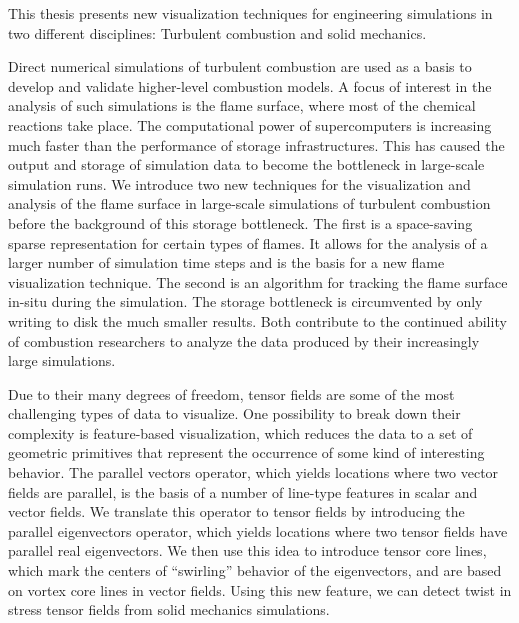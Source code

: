 %
%
This thesis presents new visualization techniques for engineering simulations in
two different disciplines: Turbulent combustion and solid mechanics.
%

%
Direct numerical simulations of turbulent combustion are used as a basis to
develop and validate higher-level combustion models.
%
A focus of interest in the analysis of such simulations is the flame surface,
where most of the chemical reactions take place.
%
The computational power of supercomputers is increasing much faster than the
performance of storage infrastructures.
%
This has caused the output and storage of simulation data to become the
bottleneck in large-scale simulation runs.
%
We introduce two new techniques for the visualization and analysis of the flame
surface in large-scale simulations of turbulent combustion before the background
of this storage bottleneck.
%
The first is a space-saving sparse representation for certain types of flames.
%
It allows for the analysis of a larger number of simulation time steps and is
the basis for a new flame visualization technique.
%
The second is an algorithm for tracking the flame surface in-situ during the
simulation.
%
The storage bottleneck is circumvented by only writing to disk the much smaller
results.
%
Both contribute to the continued ability of combustion researchers to analyze
the data produced by their increasingly large simulations.
%

%
Due to their many degrees of freedom, tensor fields are some of the most
challenging types of data to visualize.
%
One possibility to break down their complexity is feature-based visualization,
which reduces the data to a set of geometric primitives that represent the
occurrence of some kind of interesting behavior.
%
The parallel vectors operator, which yields locations where two vector fields
are parallel, is the basis of a number of line-type features in scalar and
vector fields.
%
We translate this operator to tensor fields by introducing the parallel
eigenvectors operator, which yields locations where two tensor fields have
parallel real eigenvectors.
%
We then use this idea to introduce tensor core lines, which mark the centers of
``swirling'' behavior of the eigenvectors, and are based on vortex core lines in
vector fields.
%
Using this new feature, we can detect twist in stress tensor fields from solid
mechanics simulations.
%